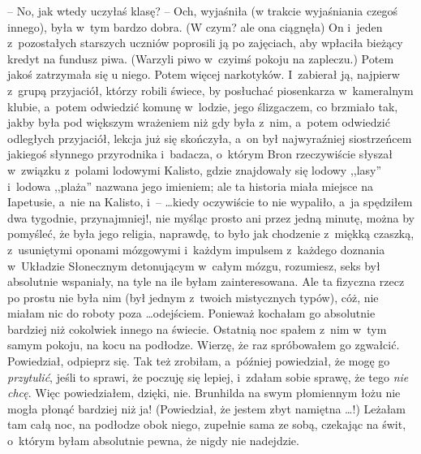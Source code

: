 \documentclass[oneside,polish,11pt,rmheadings]{mwbk}
\begin{document}
-- No, jak wtedy uczyłaś klasę? -- Och, wyjaśniła (w trakcie wyjaśniania czegoś innego), była w~tym bardzo dobra. (W czym? ale ona ciągnęła) On i~jeden z~pozostałych starszych uczniów poprosili ją po zajęciach, aby wpłaciła bieżący kredyt na fundusz piwa. (Warzyli piwo w~czyimś pokoju na zapleczu.) Potem jakoś zatrzymała się u niego. Potem więcej narkotyków. I~zabierał ją, najpierw z~grupą przyjaciół, którzy robili świece, by posłuchać piosenkarza w~kameralnym klubie, a~potem odwiedzić komunę w~lodzie, jego ślizgaczem, co brzmiało tak, jakby była pod większym wrażeniem niż gdy była z~nim, a~potem odwiedzić odległych przyjaciół, lekcja już się skończyła, a~on był najwyraźniej siostrzeńcem jakiegoś słynnego przyrodnika i~badacza, o~którym Bron rzeczywiście słyszał w~związku z~polami lodowymi Kalisto, gdzie znajdowały się lodowy ,,lasy'' i~lodowa ,,plaża'' nazwana jego imieniem; ale ta historia miała miejsce na Iapetusie, a~nie na Kalisto, i~--  \ldots  kiedy oczywiście to nie wypaliło, a~ja spędziłem dwa tygodnie, przynajmniej!, nie myśląc prosto ani przez jedną minutę, można by pomyśleć, że była jego religia, naprawdę, to było jak chodzenie z~miękką czaszką, z~usuniętymi oponami mózgowymi i~każdym impulsem z~każdego doznania w~Układzie Słonecznym detonującym w~całym mózgu, rozumiesz, seks był absolutnie wspaniały, na tyle na ile byłam zainteresowana. Ale ta fizyczna rzecz po prostu nie była nim (był jednym z~twoich mistycznych typów), cóż, nie miałam nic do roboty poza \ldots  odejściem. Ponieważ kochałam go absolutnie bardziej niż cokolwiek innego na świecie. Ostatnią noc spałem z~nim w~tym samym pokoju, na kocu na podłodze. Wierzę, że raz spróbowałem go zgwałcić. Powiedział, odpieprz się. Tak też zrobiłam, a~później powiedział, że mogę go \textit{przytulić}, jeśli to sprawi, że poczuję się lepiej, i~zdałam sobie sprawę, że tego \textit{nie chcę}. Więc powiedziałem, dzięki, nie. Brunhilda na swym płomiennym łożu nie mogła płonąć bardziej niż ja! (Powiedział, że jestem zbyt namiętna \ldots !) Leżałam tam całą noc, na podłodze obok niego, zupełnie sama ze sobą, czekając na świt, o~którym byłam absolutnie pewna, że nigdy nie nadejdzie. 
\end{document}
